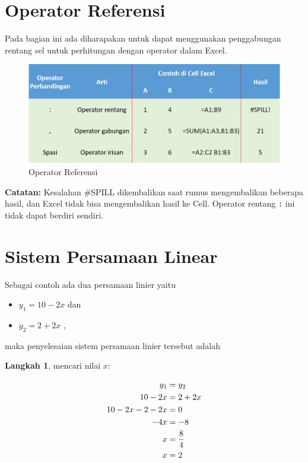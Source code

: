 \documentclass[
]{book}
\providecommand{\tightlist}{%
  \setlength{\itemsep}{0pt}\setlength{\parskip}{0pt}}
\begin{document}
\hypertarget{operator-referensi}{%
\section{Operator Referensi}\label{operator-referensi}}

Pada bagian ini ada diharapakan untuk dapat menggunakan penggabungan rentang sel untuk perhitungan dengan operator dalam Excel.

\begin{figure}

{\centering \includegraphics[width=0.75\linewidth]{images/referensi} 

}

\caption{Operator Referensi}\label{fig:referensi}
\end{figure}

\textbf{Catatan:} Kesalahan \#SPILL dikembalikan saat rumus mengembalikan beberapa hasil, dan Excel tidak bisa mengembalikan hasil ke Cell. Operator rentang \texttt{:} ini tidak dapat berdiri sendiri.

\hypertarget{sistem-persamaan-linear}{%
\section{Sistem Persamaan Linear}\label{sistem-persamaan-linear}}

Sebagai contoh ada dua persamaan linier yaitu

\begin{itemize}
\tightlist
\item
  \(y_1 = 10 -2x\) dan
\item
  \(y_2 = 2 + 2x\) ,
\end{itemize}

maka penyelesaian sistem persamaan linier tersebut adalah

\textbf{Langkah 1}, mencari nilai \(x:\)

\[
\begin{aligned}
y_1   &= y_2 \\
10-2x &= 2+2x\\
10-2x-2-2x &= 0 \\
-4x &= -8\\
x &= {8\over 4} \\
x &= 2 \\
\end{aligned}
\]
\end{document}
